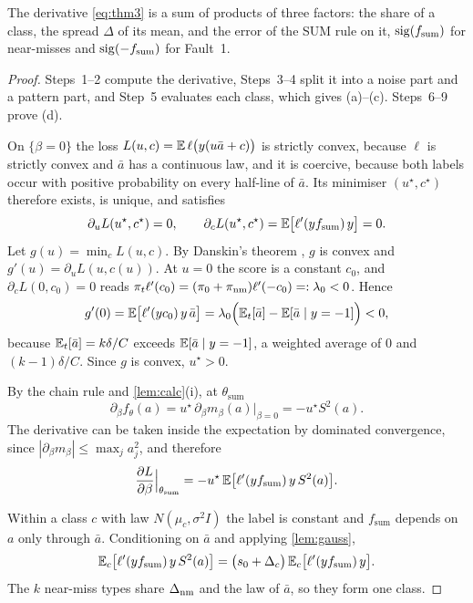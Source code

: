The derivative \cref{eq:thm3} is a sum of products of three factors: the share of a class, the spread $\Delta$ of its mean, and the error of the SUM rule on it, $\operatorname{sig}(f_{\mathrm{sum}})$ for near-misses and $\operatorname{sig}(-f_{\mathrm{sum}})$ for Fault~1.

\begin{proof}
Steps~1--2 compute the derivative, Steps~3--4 split it into a noise part and a pattern part, and Step~5 evaluates each class, which gives (a)--(c). Steps~6--9 prove (d).

 On $\{\beta=0\}$ the loss $L(u,c)=\mathbb{E}\,\ell\big(y(u\bar a+c)\big)$ is strictly convex, because $\ell$ is strictly convex and $\bar a$ has a continuous law, and it is coercive, because both labels occur with positive probability on every half-line of $\bar a$. Its minimiser $(u^\star,c^\star)$ therefore exists, is unique, and satisfies
\begin{equation}\label{eq:foc}
  \partial_uL(u^\star,c^\star)=0,
  \qquad
  \partial_cL(u^\star,c^\star)=\mathbb{E}\big[\ell'(yf_{\mathrm{sum}})\,y\big]=0 .
\end{equation}
Let $g(u)=\min_cL(u,c)$. By Danskin's theorem \citep{danskin1967}, $g$ is convex and $g'(u)=\partial_uL(u,c(u))$. At $u=0$ the score is a constant $c_0$, and $\partial_cL(0,c_0)=0$ reads $\pi_t\ell'(c_0)=(\pi_0+\pi_{\mathrm{nm}})\ell'(-c_0)=:\lambda_0<0$. Hence
\begin{equation}\label{eq:gprime}
  g'(0)=\mathbb{E}\big[\ell'(yc_0)\,y\,\bar a\big]
  =\lambda_0\Big(\mathbb{E}_t[\bar a]-\mathbb{E}[\bar a\mid y=-1]\Big)<0,
\end{equation}
because $\mathbb{E}_t[\bar a]=k\delta/C$ exceeds $\mathbb{E}[\bar a\mid y=-1]$, a weighted average of $0$ and $(k-1)\delta/C$. Since $g$ is convex, $u^\star>0$.

 By the chain rule and \cref{lem:calc}(i), at $\theta_{\mathrm{sum}}$
\begin{equation}\label{eq:df}
  \partial_\beta f_\theta(a)=u^\star\,\partial_\beta m_\beta(a)\big|_{\beta=0}=-u^\star S^2(a).
\end{equation}
The derivative can be taken inside the expectation by dominated convergence, since $|\partial_\beta m_\beta|\le\max_ja_j^2$, and therefore
\begin{equation}\label{eq:dL}
  \frac{\partial L}{\partial\beta}\Big|_{\theta_{\mathrm{sum}}}
  =-u^\star\,\mathbb{E}\big[\ell'(yf_{\mathrm{sum}})\,y\,S^2(a)\big].
\end{equation}

 Within a class $c$ with law $N(\mu_c,\sigma^2I)$ the label is constant and $f_{\mathrm{sum}}$ depends on $a$ only through $\bar a$. Conditioning on $\bar a$ and applying \cref{lem:gauss},
\begin{equation}\label{eq:condition}
  \mathbb{E}_c\big[\ell'(yf_{\mathrm{sum}})\,y\,S^2(a)\big]
  =\big(s_0+\Delta_c\big)\,\mathbb{E}_c\big[\ell'(yf_{\mathrm{sum}})\,y\big].
\end{equation}
The $k$ near-miss types share $\Delta_{\mathrm{nm}}$ and the law of $\bar a$, so they form one class.


\end{proof}
